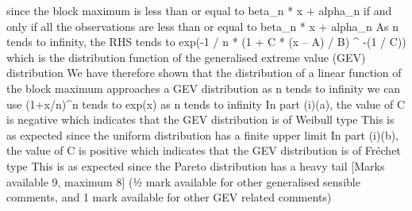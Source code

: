 \documentclass[a4paper,12pt]{article}
\begin{document}
since the block maximum is less than or equal to beta_n * x + alpha_n if and only if all the observations are less than or equal to beta_n * x + alpha_n 
As n tends to infinity, the RHS tends to exp(-1 / n * (1 + C * (x – A) / B) ^ -(1 / C)) 
which is the distribution function of the generalised extreme value (GEV) distribution 
We have therefore shown that the distribution of a linear function of the block maximum approaches a GEV distribution as n tends to infinity 
we can use (1+x/n)^n tends to exp(x) as n tends to infinity 
In part (i)(a), the value of C is negative 
which indicates that the GEV distribution is of Weibull type 
This is as expected since the uniform distribution has a finite upper limit 
In part (i)(b), the value of C is positive 
which indicates that the GEV distribution is of Fréchet type 
This is as expected since the Pareto distribution has a heavy tail 
[Marks available 9, maximum 8]
(½ mark available for other generalised sensible comments, and 1 mark available for other GEV related comments)
\end{document}
